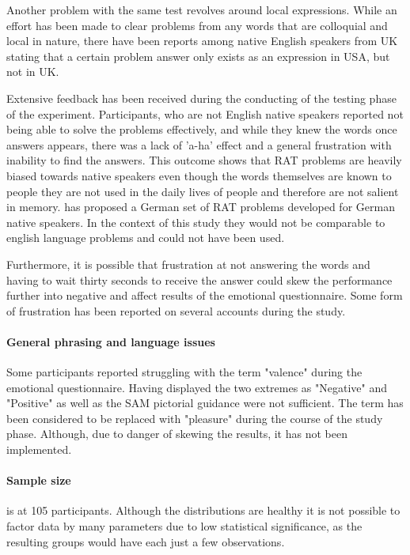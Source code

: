 	Another problem with the same test revolves around local expressions. While an effort has been made to clear problems from any words that are colloquial and local in nature, there have been reports among native English speakers from UK stating that a certain problem answer only exists as an expression in USA, but not in UK.	%
	
	Extensive feedback has been received during the conducting of the testing phase of the experiment. Participants, who are not English native speakers reported not being able to solve the problems effectively, and while they knew the words once answers appears, there was a lack of 'a-ha' effect and a general frustration with inability to find the answers. This outcome shows that RAT problems are heavily biased towards native speakers even though the words themselves are known to people they are not used in the daily lives of people and therefore are not salient in memory. \cite{Landmann2014} has proposed a German set of RAT problems developed for German native speakers. In the context of this study they would not be comparable to english language problems and could not have been used.
	
	Furthermore, it is possible that frustration at not answering the words and having to wait thirty seconds to receive the answer could skew the performance further into negative and affect results of the emotional questionnaire. Some form of frustration has been reported on several accounts during the study.
	

	\paragraph{General phrasing and language issues}
	
	Some participants reported struggling with the term "valence" during the emotional questionnaire. Having displayed the two extremes as "Negative" and "Positive" as well as the SAM pictorial guidance were not sufficient. The term has been considered to be replaced with "pleasure" during the course of the study phase. Although, due to danger of skewing the results, it has not been implemented.
		
	 \paragraph{Sample size} is at 105 participants. Although the distributions are healthy it is not possible to factor data by many parameters due to low statistical significance, as the resulting groups would have each just a few observations.
	
